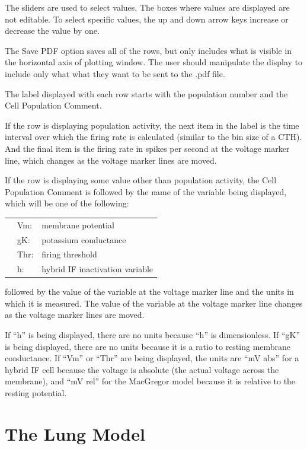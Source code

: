 \documentclass[12pt,openany,oneside]{book}
\newcommand{\inquotes}[1]{{{``#1''}}}
\begin{document}
The sliders are used to select values. The boxes where values are displayed
are not editable. To select specific values, the up and down arrow 
keys increase or decrease the value by one.

The Save PDF option saves all of the rows, but only includes what is
visible in the horizontal axis of plotting window.  The user should
manipulate the display to include only what what they want to be sent to
the .pdf file.

The label displayed with each row starts with the population number
and the Cell Population Comment.

If the row is displaying population activity, the next item in the
label is the time interval over which the firing rate is calculated
(similar to the bin size of a CTH). And the final item is the firing
rate in spikes per second at the voltage marker line, which changes as
the voltage marker lines are moved.
\filbreak

If the row is displaying some value other than population activity,
the Cell Population Comment is followed by the name of the variable
being displayed, which will be one of the following:
\begin{flushleft}
\begin{tabular}{@{}lll@{}}
& Vm: & membrane potential\\
& gK: & potassium conductance\\
& Thr: & firing threshold\\
& h: & hybrid IF inactivation variable\\
\end{tabular}
\end{flushleft}
\noindent followed by the value of the variable at the voltage marker line and
the units in which it is measured. The value of the variable at the
voltage marker line changes as the voltage marker lines are moved.

If \inquotes{h} is being displayed, there are no units because
\inquotes{h} is
dimensionless. If \inquotes{gK} is being displayed, there are no units
because it is a ratio to resting membrane conductance. If \inquotes{Vm} or
\inquotes{Thr} are being displayed, the units are \inquotes{mV abs} for a hybrid IF
cell because the voltage is absolute (the actual voltage across the
membrane), and \inquotes{mV rel} for the MacGregor model because it is
relative to the resting potential.

\clearpage
\section{The Lung Model}
\label{The Lung Model}
\end{document}
